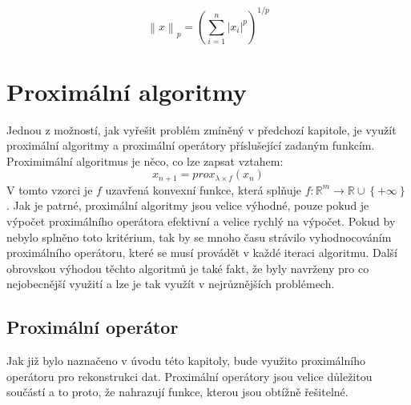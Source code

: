 \documentclass[FM,BP]{tulthesis}
\newcounter{Vzorce}
\begin{document}
\begin{equation} \label{eq:norma} \tag{Vzorec \theVzorce}
\left\|x\right\|_p = \left(\sum_{i=1}^{n} \left|x_i\right|^p\right)^{1/p}
\end{equation}

\chapter{Proximální algoritmy}
\label{ch:proxalg}
Jednou z možností, jak vyřešit problém zmíněný v předchozí kapitole, je využít proximální algoritmy a proximální operátory příslušející zadaným funkcím. Proximimální algoritmus je něco, co lze zapsat vztahem:
\begin{equation} \label{eq:proxAlg} \tag{Vzorec \theVzorce}
x_{n+1} = prox_{\lambda \times f}(x_{n})
\end{equation}
V tomto vzorci je $f$ uzavřená konvexní funkce, která splňuje $f : \mathbb{R}^{m} \rightarrow \mathbb{R} \cup \left\{+\infty\right\}$. Jak je patrné, proximální algoritmy jsou velice výhodné, pouze pokud je výpočet proximálního operátora efektivní a velice rychlý na výpočet. Pokud by nebylo splněno toto kritérium, tak by se mnoho času strávilo vyhodnocováním proximálního operátoru, které se musí provádět v každé iteraci algoritmu. Další obrovskou výhodou těchto algoritmů je také fakt, že byly navrženy pro co nejobecnější využití a lze je tak využít v nejrůznějších problémech.

\section{Proximální operátor}
Jak již bylo naznačeno v úvodu této kapitoly, bude využito proximálního operátoru pro rekonstrukci dat. Proximální operátory jsou velice důležitou součástí a to proto, že nahrazují funkce, kterou jsou obtížně řešitelné. 
\end{document}
